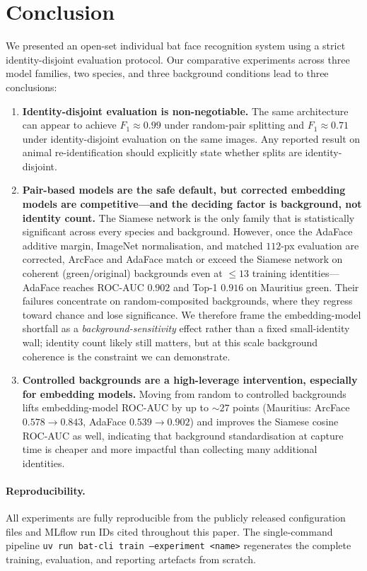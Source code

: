 \section{Conclusion}
\label{sec:conclusion}

We presented an open-set individual bat face recognition system using a strict
identity-disjoint evaluation protocol.
Our comparative experiments across three model families, two species, and three
background conditions lead to three conclusions:

\begin{enumerate}[leftmargin=1.6em, itemsep=3pt]
  \item \textbf{Identity-disjoint evaluation is non-negotiable.}
        The same architecture can appear to achieve $F_1 \approx 0.99$ under random-pair
        splitting and $F_1 \approx 0.71$ under identity-disjoint evaluation on the same
        images.  Any reported result on animal re-identification should explicitly state
        whether splits are identity-disjoint.

  \item \textbf{Pair-based models are the safe default, but corrected embedding models
        are competitive---and the deciding factor is background, not identity count.}
        The Siamese network is the only family that is statistically significant across
        every species and background.  However, once the AdaFace additive margin,
        ImageNet normalisation, and matched $112$-px evaluation are corrected, ArcFace and
        AdaFace match or exceed the Siamese network on coherent (green/original)
        backgrounds even at $\le\!13$ training identities---AdaFace reaches ROC-AUC
        $0.902$ and Top-1 $0.916$ on Mauritius green.  Their failures concentrate on
        random-composited backgrounds, where they regress toward chance and lose
        significance.  We therefore frame the embedding-model shortfall as a
        \emph{background-sensitivity} effect rather than a fixed small-identity wall;
        identity count likely still matters, but at this scale background coherence is the
        constraint we can demonstrate.

  \item \textbf{Controlled backgrounds are a high-leverage intervention, especially for
        embedding models.}
        Moving from random to controlled backgrounds lifts embedding-model ROC-AUC by up
        to ${\sim}\!27$ points (Mauritius: ArcFace $0.578\!\to\!0.843$, AdaFace
        $0.539\!\to\!0.902$) and improves the Siamese cosine ROC-AUC as well, indicating
        that background standardisation at capture time is cheaper and more impactful than
        collecting many additional identities.
\end{enumerate}

\paragraph{Reproducibility.}
All experiments are fully reproducible from the publicly released configuration files
and MLflow run IDs cited throughout this paper.  The single-command pipeline
\texttt{uv run bat-cli train --experiment <name>} regenerates the complete training,
evaluation, and reporting artefacts from scratch.
